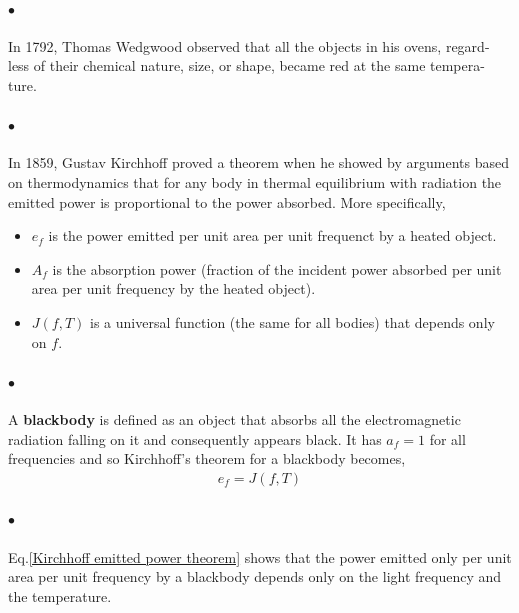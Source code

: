 \documentclass[a4paper]{report}
\begin{document}
            \paragraph{$\bullet$} In 1792, Thomas Wedgwood observed that all the objects in his ovens, regard- less 
            of their chemical nature, size, or shape, became red at the same tempera- ture.
            \paragraph{$\bullet$} In 1859, Gustav Kirchhoff proved a theorem when he showed by arguments based 
            on thermodynamics that for any body in thermal equilibrium with radiation the emitted power is 
            proportional to the power absorbed. More specifically,
            {\tiny \begin{itemize}
                \item $e_f$ is the power emitted per unit area per unit frequenct by a heated object.
                \item $A_f$ is the absorption power (fraction of the incident power absorbed per 
                unit area per unit frequency by the heated object).
                \item $J(f, T)$ is a universal function (the same for all bodies) that depends only on $f$.
            \end{itemize}}

            \paragraph{$\bullet$} A \textbf{blackbody} is defined as an object that absorbs all the electromagnetic 
            radiation falling on it and consequently appears black. It has $a_f=1$ for all frequencies 
            and so Kirchhoff’s theorem for a blackbody becomes,
            \begin{align} \label{kirchhoff theorm blackbody}
                e_f=J(f, T)
            \end{align}

            \paragraph{$\bullet$} Eq.\eqref{Kirchhoff emitted power theorem} shows that the power emitted only
            per unit area per unit frequency by a blackbody depends only on the light frequency and the 
            temperature.
\end{document}
